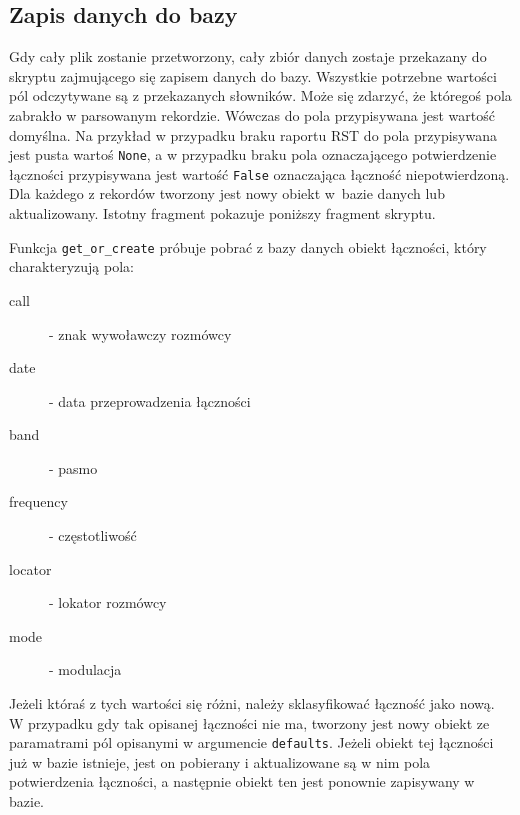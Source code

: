 \documentclass[]{mgr}
\begin{document}
            \subsection{Zapis danych do bazy}
            Gdy cały plik zostanie przetworzony, cały zbiór danych zostaje przekazany do skryptu zajmującego się zapisem danych do bazy. Wszystkie potrzebne wartości pól odczytywane są z przekazanych słowników. Może się zdarzyć, że któregoś pola zabrakło w parsowanym rekordzie. Wówczas do pola przypisywana jest wartość domyślna. Na przykład w przypadku braku raportu RST do pola przypisywana jest pusta wartoś \texttt{None}, a w przypadku braku pola oznaczającego potwierdzenie łączności przypisywana jest wartość \texttt{False} oznaczająca łączność niepotwierdzoną. Dla każdego z rekordów tworzony jest nowy obiekt w~bazie danych lub aktualizowany. Istotny fragment pokazuje poniższy fragment skryptu.
            
            Funkcja \texttt{get\_or\_create} próbuje pobrać z bazy danych obiekt łączności, który charakteryzują pola:
            \begin{description}
                \item[call] - znak wywoławczy rozmówcy
                \item[date] - data przeprowadzenia łączności
                \item[band] - pasmo
                \item[frequency] - częstotliwość
                \item[locator] - lokator rozmówcy
                \item[mode] - modulacja
            \end{description}
            Jeżeli któraś z tych wartości się różni, należy sklasyfikować łączność jako nową. W przypadku gdy tak opisanej łączności nie ma, tworzony jest nowy obiekt ze paramatrami pól opisanymi w argumencie \texttt{defaults}. Jeżeli obiekt tej łączności już w bazie istnieje, jest on pobierany i aktualizowane są w nim pola potwierdzenia łączności, a następnie obiekt ten jest ponownie zapisywany w bazie.
\end{document}
